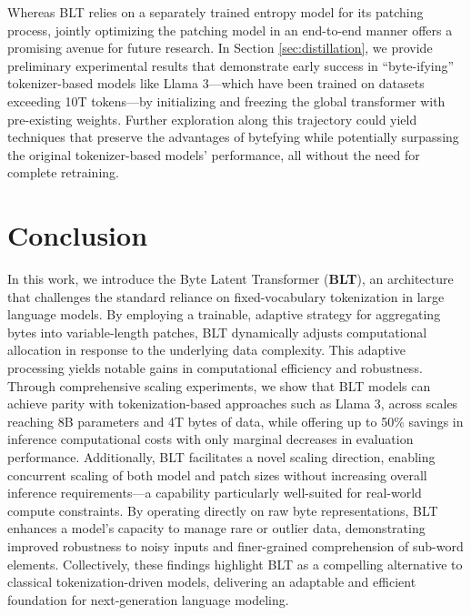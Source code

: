 Whereas {\textsc BLT} relies on a separately trained entropy model for its patching process, jointly optimizing the patching model in an end-to-end manner offers a promising avenue for future research. In Section \ref{sec:distillation}, we provide preliminary experimental results that demonstrate early success in ``byte-ifying'' tokenizer-based models like Llama 3—which have been trained on datasets exceeding 10T tokens—by initializing and freezing the global transformer with pre-existing weights. Further exploration along this trajectory could yield techniques that preserve the advantages of bytefying while potentially surpassing the original tokenizer-based models' performance, all without the need for complete retraining.

\section{Conclusion}
\label{section:conclusion}

In this work, we introduce the Byte Latent Transformer (\textbf{BLT}), an architecture that challenges the standard reliance on fixed-vocabulary tokenization in large language models. By employing a trainable, adaptive strategy for aggregating bytes into variable-length patches, {\textsc BLT} dynamically adjusts computational allocation in response to the underlying data complexity. This adaptive processing yields notable gains in computational efficiency and robustness. Through comprehensive scaling experiments, we show that {\textsc BLT} models can achieve parity with tokenization-based approaches such as Llama 3, across scales reaching 8B parameters and 4T bytes of data, while offering up to 50\% savings in inference computational costs with only marginal decreases in evaluation performance. Additionally, {\textsc BLT} facilitates a novel scaling direction, enabling concurrent scaling of both model and patch sizes without increasing overall inference requirements—a capability particularly well-suited for real-world compute constraints. By operating directly on raw byte representations, {\textsc BLT} enhances a model’s capacity to manage rare or outlier data, demonstrating improved robustness to noisy inputs and finer-grained comprehension of sub-word elements. Collectively, these findings highlight {\textsc BLT} as a compelling alternative to classical tokenization-driven models, delivering an adaptable and efficient foundation for next-generation language modeling.

